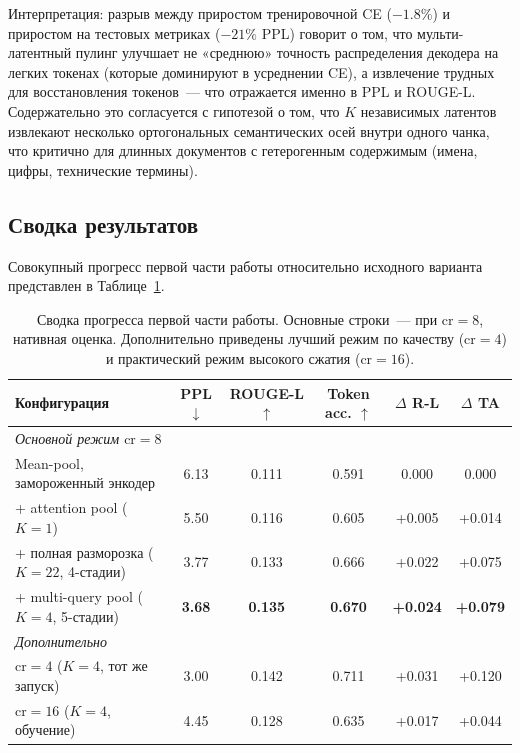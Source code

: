 \documentclass[a4paper,12pt]{extarticle}
\begin{document}
Интерпретация: разрыв между приростом тренировочной CE ($-1.8\%$) и приростом на тестовых метриках ($-21\%$ PPL) говорит о том, что мульти-латентный пулинг улучшает не «среднюю» точность распределения декодера на легких токенах (которые доминируют в усреднении CE), а извлечение трудных для восстановления токенов~--- что отражается именно в PPL и ROUGE-L. Содержательно это согласуется с гипотезой о том, что $K$ независимых латентов извлекают несколько ортогональных семантических осей внутри одного чанка, что критично для длинных документов с гетерогенным содержимым (имена, цифры, технические термины).

\subsection{Сводка результатов}\label{sec:experiments-summary}

Совокупный прогресс первой части работы относительно исходного варианта представлен в Таблице~\ref{tab:summary}.

\begin{table}[ht]
\centering
\caption{Сводка прогресса первой части работы. Основные строки~--- при $\text{cr}=8$, нативная оценка. Дополнительно приведены лучший режим по качеству ($\text{cr}=4$) и практический режим высокого сжатия ($\text{cr}=16$).}
\label{tab:summary}
\begin{tabular}{lccccc}
\toprule
\textbf{Конфигурация} & \textbf{PPL} $\downarrow$ & \textbf{ROUGE-L} $\uparrow$ & \textbf{Token acc.} $\uparrow$ & $\Delta$ R-L & $\Delta$ TA \\
\midrule
\multicolumn{6}{l}{\emph{Основной режим $\text{cr}=8$}} \\
Mean-pool, замороженный энкодер              & 6.13          & 0.111          & 0.591          & 0.000           & 0.000 \\
\;\;+ attention pool ($K=1$)                 & 5.50          & 0.116          & 0.605          & +0.005          & +0.014 \\
\;\;+ полная разморозка ($K=22$, 4-стадии)   & 3.77          & 0.133          & 0.666          & +0.022          & +0.075 \\
\;\;+ multi-query pool ($K{=}4$, 5-стадии)   & \textbf{3.68} & \textbf{0.135} & \textbf{0.670} & \textbf{+0.024} & \textbf{+0.079} \\
\midrule
\multicolumn{6}{l}{\emph{Дополнительно}} \\
$\text{cr}=4$ ($K{=}4$, тот же запуск)       & 3.00          & 0.142          & 0.711          & +0.031          & +0.120 \\
$\text{cr}=16$ ($K{=}4$, обучение)           & 4.45          & 0.128          & 0.635          & +0.017          & +0.044 \\
\bottomrule
\end{tabular}
\end{table}
\end{document}
